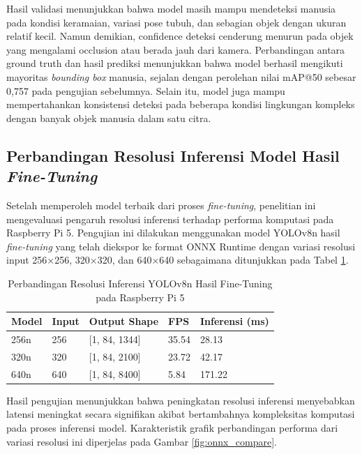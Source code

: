 Hasil validasi menunjukkan bahwa model masih mampu mendeteksi manusia pada kondisi keramaian, variasi pose tubuh, dan sebagian objek dengan ukuran relatif kecil.
Namun demikian, confidence deteksi cenderung menurun pada objek yang mengalami occlusion atau berada jauh dari kamera.
Perbandingan antara ground truth dan hasil prediksi menunjukkan bahwa model berhasil mengikuti mayoritas \textit{bounding box} manusia, sejalan dengan perolehan nilai mAP@50 sebesar 0,757 pada pengujian sebelumnya.
Selain itu, model juga mampu mempertahankan konsistensi deteksi pada beberapa kondisi lingkungan kompleks dengan banyak objek manusia dalam satu citra.
\subsection{Perbandingan Resolusi Inferensi Model Hasil \textit{Fine-Tuning}}

Setelah memperoleh model terbaik dari proses \textit{fine-tuning}, penelitian ini mengevaluasi pengaruh resolusi inferensi terhadap performa komputasi pada Raspberry Pi 5. Pengujian ini dilakukan menggunakan model YOLOv8n hasil \textit{fine-tuning} yang telah diekspor ke format ONNX Runtime dengan variasi resolusi input 256×256, 320×320, dan 640×640 sebagaimana ditunjukkan pada Tabel \ref{tab:benchmark_resolution}.

\begin{table}[H]
	\centering
	\caption{Perbandingan Resolusi Inferensi YOLOv8n Hasil Fine-Tuning pada Raspberry Pi 5}
	\label{tab:benchmark_resolution}
	\renewcommand{\arraystretch}{1.2}
	\begin{tabular}{|p{2.5cm}|p{2cm}|p{3cm}|p{2cm}|p{3cm}|}
		\hline
		\textbf{Model} &
		\textbf{Input} &
		\textbf{Output Shape} &
		\textbf{FPS} &
		\textbf{Inferensi (ms)} \\ \hline
		
		256n &
		256 &
		[1, 84, 1344] &
		35.54 &
		28.13 \\ \hline
		
		320n &
		320 &
		[1, 84, 2100] &
		23.72 &
		42.17 \\ \hline
		
		640n &
		640 &
		[1, 84, 8400] &
		5.84 &
		171.22 \\ \hline
	\end{tabular}
\end{table}

Hasil pengujian menunjukkan bahwa peningkatan resolusi inferensi menyebabkan latensi meningkat secara signifikan akibat bertambahnya kompleksitas komputasi pada proses inferensi model. Karakteristik grafik perbandingan performa dari variasi resolusi ini diperjelas pada Gambar \ref{fig:onnx_compare}.

